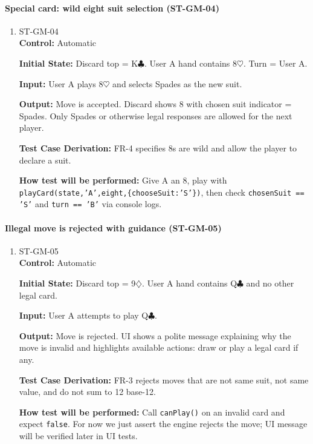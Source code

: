 \documentclass[12pt, titlepage]{article}
\begin{document}
\paragraph{Special card: wild eight suit selection (ST-GM-04)}
\begin{enumerate}
\item{ST-GM-04\\}
\textbf{Control:} Automatic

\textbf{Initial State:} Discard top = K$\clubsuit$. User A hand contains 8$\heartsuit$. Turn = User A.

\textbf{Input:} User A plays 8$\heartsuit$ and selects Spades as the new suit.

\textbf{Output:} Move is accepted. Discard shows 8 with chosen suit indicator = Spades. Only Spades or otherwise legal responses are allowed for the next player.

\textbf{Test Case Derivation:} FR-4 specifies 8s are wild and allow the player to declare a suit.

\textbf{How test will be performed:} Give A an 8, play with \linebreak 
\texttt{playCard(state,'A',eight,\{chooseSuit:'S'\})}, then check \texttt{chosenSuit == 'S'} and \texttt{turn == 'B'} via console logs.
\end{enumerate}

\paragraph{Illegal move is rejected with guidance (ST-GM-05)}
\begin{enumerate}
\item{ST-GM-05\\}
\textbf{Control:} Automatic

\textbf{Initial State:} Discard top = 9$\diamondsuit$. User A hand contains Q$\clubsuit$ and no other legal card.

\textbf{Input:} User A attempts to play Q$\clubsuit$.

\textbf{Output:} Move is rejected. UI shows a polite message explaining why the move is invalid and highlights available actions: draw or play a legal card if any.

\textbf{Test Case Derivation:} FR-3 rejects moves that are not same suit, not same value, and do not sum to 12 base-12.

\textbf{How test will be performed:} Call \texttt{canPlay()} on an invalid card and expect \texttt{false}. For now we just assert the engine rejects the move; UI message will be verified later in UI tests.
\end{enumerate}
\end{document}
